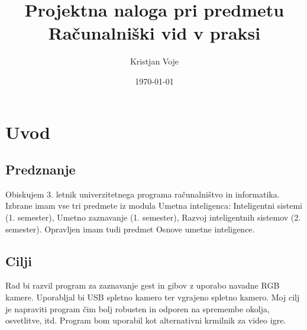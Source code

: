 \documentclass[a4paper, 12pt]{article}
\title{	Projektna naloga pri predmetu \\
		Računalniški vid v praksi	}
\author{Kristjan Voje}
\date{\today}
\begin{document}
\maketitle
\section{Uvod}
\subsection{Predznanje}
Obiskujem 3. letnik univerzitetnega programa računalništvo in informatika.
Izbrane imam vse tri predmete iz modula Umetna inteligenca: Inteligentni sistemi (1. semester), Umetno zaznavanje (1. semester), Razvoj inteligentnih sistemov (2. semester).
Opravljen imam tudi predmet Osnove umetne inteligence.

\subsection{Cilji}
Rad bi razvil program za zaznavanje gest in gibov z uporabo navadne RGB kamere. Uporabljal bi USB spletno kamero ter vgrajeno spletno kamero. Moj cilj je napraviti program čim bolj robusten in odporen na spremembe okolja, osvetlitve, itd.
Program bom uporabil kot alternativni krmilnik za video igre.
\end{document}
